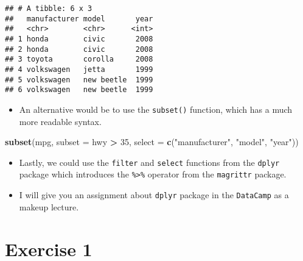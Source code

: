 \documentclass[]{book}
\newenvironment{Shaded}{\begin{snugshade}}{\end{snugshade}}
\newcommand{\KeywordTok}[1]{\textcolor[rgb]{0.13,0.29,0.53}{\textbf{#1}}}
\newcommand{\DataTypeTok}[1]{\textcolor[rgb]{0.13,0.29,0.53}{#1}}
\newcommand{\DecValTok}[1]{\textcolor[rgb]{0.00,0.00,0.81}{#1}}
\newcommand{\StringTok}[1]{\textcolor[rgb]{0.31,0.60,0.02}{#1}}
\newcommand{\OperatorTok}[1]{\textcolor[rgb]{0.81,0.36,0.00}{\textbf{#1}}}
\newcommand{\NormalTok}[1]{#1}
\providecommand{\tightlist}{%
  \setlength{\itemsep}{0pt}\setlength{\parskip}{0pt}}
\begin{document}
\begin{verbatim}
## # A tibble: 6 x 3
##   manufacturer model       year
##   <chr>        <chr>      <int>
## 1 honda        civic       2008
## 2 honda        civic       2008
## 3 toyota       corolla     2008
## 4 volkswagen   jetta       1999
## 5 volkswagen   new beetle  1999
## 6 volkswagen   new beetle  1999
\end{verbatim}

\begin{itemize}
\tightlist
\item
  An alternative would be to use the \texttt{subset()} function, which
  has a much more readable syntax.
\end{itemize}

\begin{Shaded}
\begin{Highlighting}[]
\KeywordTok{subset}\NormalTok{(mpg, }\DataTypeTok{subset =}\NormalTok{ hwy }\OperatorTok{>}\StringTok{ }\DecValTok{35}\NormalTok{, }\DataTypeTok{select =} \KeywordTok{c}\NormalTok{(}\StringTok{"manufacturer"}\NormalTok{, }\StringTok{"model"}\NormalTok{, }\StringTok{"year"}\NormalTok{))}
\end{Highlighting}
\end{Shaded}

\begin{itemize}
\tightlist
\item
  Lastly, we could use the \texttt{filter} and \texttt{select} functions
  from the \texttt{dplyr} package which introduces the
  \texttt{\%\textgreater{}\%} operator from the \texttt{magrittr}
  package.
\end{itemize}

\begin{Shaded}
\end{Shaded}

\begin{itemize}
\tightlist
\item
  I will give you an assignment about \texttt{dplyr} package in the
  \texttt{DataCamp} as a makeup lecture.
\end{itemize}

\chapter{Exercise 1}\label{exercise-1}
\end{document}
